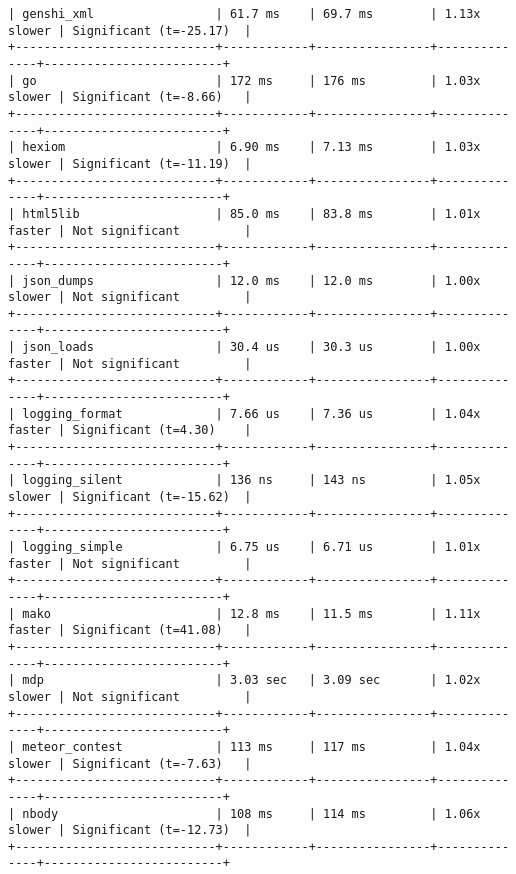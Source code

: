 \begin{code}
\begin{verbatim}
| genshi_xml                 | 61.7 ms    | 69.7 ms        | 1.13x slower | Significant (t=-25.17)  |
+----------------------------+------------+----------------+--------------+-------------------------+
| go                         | 172 ms     | 176 ms         | 1.03x slower | Significant (t=-8.66)   |
+----------------------------+------------+----------------+--------------+-------------------------+
| hexiom                     | 6.90 ms    | 7.13 ms        | 1.03x slower | Significant (t=-11.19)  |
+----------------------------+------------+----------------+--------------+-------------------------+
| html5lib                   | 85.0 ms    | 83.8 ms        | 1.01x faster | Not significant         |
+----------------------------+------------+----------------+--------------+-------------------------+
| json_dumps                 | 12.0 ms    | 12.0 ms        | 1.00x slower | Not significant         |
+----------------------------+------------+----------------+--------------+-------------------------+
| json_loads                 | 30.4 us    | 30.3 us        | 1.00x faster | Not significant         |
+----------------------------+------------+----------------+--------------+-------------------------+
| logging_format             | 7.66 us    | 7.36 us        | 1.04x faster | Significant (t=4.30)    |
+----------------------------+------------+----------------+--------------+-------------------------+
| logging_silent             | 136 ns     | 143 ns         | 1.05x slower | Significant (t=-15.62)  |
+----------------------------+------------+----------------+--------------+-------------------------+
| logging_simple             | 6.75 us    | 6.71 us        | 1.01x faster | Not significant         |
+----------------------------+------------+----------------+--------------+-------------------------+
| mako                       | 12.8 ms    | 11.5 ms        | 1.11x faster | Significant (t=41.08)   |
+----------------------------+------------+----------------+--------------+-------------------------+
| mdp                        | 3.03 sec   | 3.09 sec       | 1.02x slower | Not significant         |
+----------------------------+------------+----------------+--------------+-------------------------+
| meteor_contest             | 113 ms     | 117 ms         | 1.04x slower | Significant (t=-7.63)   |
+----------------------------+------------+----------------+--------------+-------------------------+
| nbody                      | 108 ms     | 114 ms         | 1.06x slower | Significant (t=-12.73)  |
+----------------------------+------------+----------------+--------------+-------------------------+

\end{verbatim}
\end{code}

